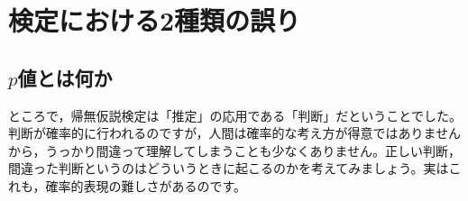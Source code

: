 \documentclass{ltjsbook}
\begin{document}
\section{検定における2種類の誤り}
\subsection{$p$値とは何か}
\label{sec:14_02}
\label{TypeI_II_Error}
ところで，帰無仮説検定は「推定」の応用である「判断」だということでした。判断が確率的に行われるのですが，人間は確率的な考え方が得意ではありませんから，うっかり間違って理解してしまうことも少なくありません。正しい判断，間違った判断というのはどういうときに起こるのかを考えてみましょう。実はこれも，確率的表現の難しさがあるのです。







\end{document}
